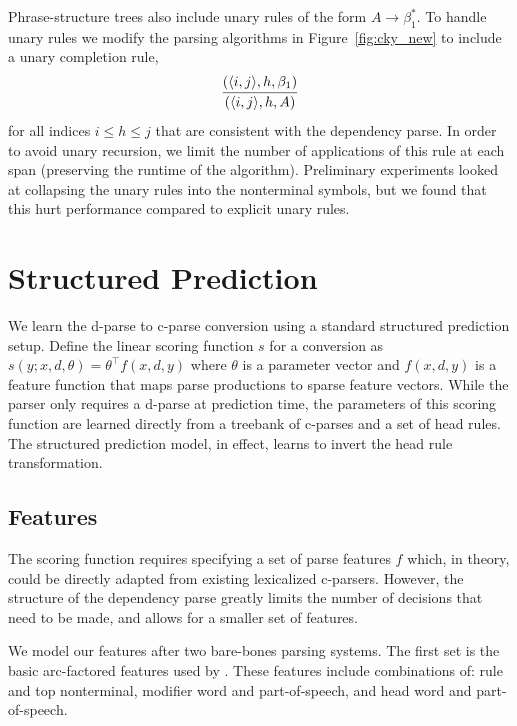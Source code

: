 \documentclass[11pt,letterpaper]{article}
\newcommand{\Span}[1]{\langle #1 \rangle}
\newcommand{\lpkcomment}[1]{\textcolor{red}{\bf \small [#1 --lpk]}}
\begin{document}
Phrase-structure trees also include unary rules of the form $A \rightarrow \beta_1^*$. 
To handle unary rules we modify the parsing algorithms in Figure~\ref{fig:cky_new}
to include a unary completion rule, 
\[\infer{( \Span{i, j}, h, A)}{(\Span{i, j}, h, \beta_1)} \]
\noindent for all indices $i \leq h \leq j$ that are consistent with the
dependency parse. In order to avoid unary recursion, we limit the
number of applications of this rule at each span (preserving the runtime of the algorithm). Preliminary experiments looked at collapsing the unary rules into
the nonterminal symbols, but we found that this hurt performance
compared to explicit unary rules.




\section{Structured Prediction}
\label{sec:strpred}
We learn the d-parse to c-parse conversion using a standard structured
prediction setup. Define the linear scoring function $s$ for a
conversion as $s(y;x, d, \theta) = \theta^{\top} f(x, d, y)$ where
$\theta$ is a parameter vector and $f(x, d, y)$ is a feature function
that maps parse productions to sparse feature vectors. While the
parser only requires a d-parse at prediction time, the parameters of 
this scoring function are learned directly from a treebank of c-parses and 
a set of head rules. The structured prediction model, in effect, learns to invert 
the head rule transformation. 



\subsection{Features}

The scoring function requires specifying a set of parse features $f$ which, in theory, could be directly adapted from existing lexicalized c-parsers. However, the structure of
the dependency parse greatly limits the number of decisions that need to be
made, and allows for a smaller set of features.

We model our features after two bare-bones parsing systems.  The first
set is the basic arc-factored features used by
. These features include
combinations of: rule and top nonterminal, modifier word and
part-of-speech, and head word and part-of-speech.
\end{document}
